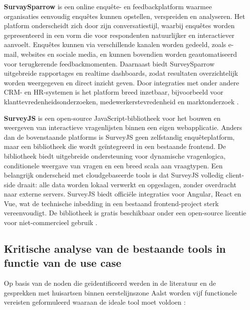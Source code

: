 \textbf{SurvaySparrow} is een online enquête- en feedbackplatform waarmee organisaties eenvoudig enquêtes kunnen opstellen, verspreiden en analyseren.
Het platform onderscheidt zich door zijn conversatiestijl, waarbij enquêtes worden gepresenteerd in een vorm die voor respondenten natuurlijker en interactiever aanvoelt.
Enquêtes kunnen via verschillende kanalen worden gedeeld, zoals e-mail, websites en sociale media, en kunnen bovendien worden geautomatiseerd voor terugkerende feedbackmomenten.
Daarnaast biedt SurveySparrow uitgebreide rapportages en realtime dashboards, zodat resultaten overzichtelijk worden weergegeven en direct inzicht geven.
Door integraties met onder andere CRM- en HR-systemen is het platform breed inzetbaar, bijvoorbeeld voor klanttevredenheidsonderzoeken, medewerkerstevredenheid en marktonderzoek \autocite{surveysparrow}.
\medskip

\textbf{SurveyJS} is een open-source JavaScript-bibliotheek voor het bouwen en weergeven van interactieve vragenlijsten binnen een eigen webapplicatie. 
Anders dan de bovenstaande platforms is SurveyJS geen zelfstandig enquêteplatform, maar een bibliotheek die wordt geïntegreerd in een bestaande frontend. 
De bibliotheek biedt uitgebreide ondersteuning voor dynamische vragenlogica, conditionele weergave van vragen en een breed scala aan vraagtypen. 
Een belangrijk onderscheid met cloudgebaseerde tools is dat SurveyJS volledig client-side draait: alle data worden lokaal verwerkt en opgeslagen, zonder overdracht naar externe servers. 
SurveyJS biedt officiële integraties voor Angular, React en Vue, wat de technische inbedding in een bestaand frontend-project sterk vereenvoudigt. 
De bibliotheek is gratis beschikbaar onder een open-source licentie voor niet-commercieel gebruik \autocite{surveyjs}.
\medskip

\subsection{Kritische analyse van de bestaande tools in functie van de use case}
\label{subsec:fitgap}

Op basis van de noden die geïdentificeerd werden in de literatuur en de gesprekken met huisartsen binnen eerstelijnszone Aalst worden vijf functionele vereisten geformuleerd waaraan de ideale tool moet voldoen \autocite{Merckx2023}:

